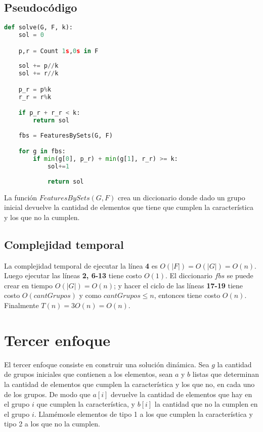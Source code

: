 \documentclass{article}
\begin{document}
\subsection*{Pseudocódigo}

\begin{lstlisting}[language = Python]
def solve(G, F, k):
    sol = 0

    p,r = Count 1s,0s in F
    
    sol += p//k
    sol += r//k

    p_r = p%k
    r_r = r%k

    if p_r + r_r < k:
        return sol
    
    fbs = FeaturesBySets(G, F)

    for g in fbs:
        if min(g[0], p_r) + min(g[1], r_r) >= k:
            sol+=1
    
            return sol

\end{lstlisting}

La función $FeaturesBySets(G, F)$ crea un diccionario donde dado un grupo inicial
devuelve la cantidad de elementos que tiene que cumplen la característica y 
los que no la cumplen.

\subsection*{Complejidad temporal}

La complejidad temporal de ejecutar la línea \textbf{4} es $O(|F|) = O(|G|) = O(n)$.
Luego ejecutar las líneas \textbf{2, 6-13} tiene costo $O(1)$. El diccionario $fbs$ se 
puede crear en tiempo $O(|G|) = O(n)$; y hacer el ciclo de las líneas \textbf{17-19} 
tiene costo $O(cantGrupos)$ y como $cantGrupos \leq n$, entonces tiene costo $O(n)$.
Finalmente $T(n) = 3O(n) = O(n)$.

\section*{Tercer enfoque}

El tercer enfoque consiste en construir una solución dinámica.
Sea $g$ la cantidad de grupos iniciales que contienen a los elementos, 
sean $a$ y $b$ listas que determinan la cantidad de elementos que cumplen
la característica y los que no, en cada uno de los grupos. De modo que $a[i]$ 
devuelve la cantidad de elementos que hay en el grupo $i$ que cumplen la característica,
y $b[i]$ la cantidad que no la cumplen en el grupo $i$.
Llamémosle elementos de tipo 1 a los que cumplen la característica y tipo 2 a los 
que no la cumplen. 
\end{document}
